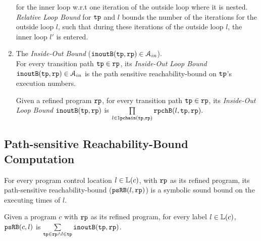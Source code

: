 \begin{enumerate}
{for the inner loop w.r.t one iteration of the outside loop where it is nested.
\emph{Relative Loop Bound} for $\mathtt{tp}$ and $l$ bounds the number of the iterations for
the outside loop $l$,
such that during these iterations of the outside loop $l$, the inner loop $l'$ is entered. 
}
\item The \emph{Inside-Out Bound} ($\mathtt{inoutB}(\mathtt{tp}, \mathtt{rp}) \in \mathcal{A}_{in}$).
\\
For every transition path $\mathtt{tp} \in \mathtt{rp}$,
its \emph{Inside-Out Loop Bound}
 $\mathtt{inoutB}(\mathtt{tp}, \mathtt{rp}) \in \mathcal{A}_{in}$ is 
the path sensitive reachability-bound on $\mathtt{tp}$'s execution numbers.

\begin{defn}
  \label{def:outin_bound}
  Given a refined program $\mathtt{rp}$, for every transition path $\mathtt{tp} \in \mathtt{rp}$, 
  its \emph{Inside-Out Loop Bound}
  $\mathtt{inoutB}(\mathtt{tp}, \mathtt{rp})$ is 
$
  \prod\limits_{l \in \mathtt{lpchain}(\mathtt{tp}, \mathtt{rp})} \mathtt{rpchB}(l, \mathtt{tp}, \mathtt{rp}).
$
\end{defn}
\end{enumerate}
\subsection{Path-sensitive Reachability-Bound Computation}

For every program control location $l \in \mathbb{L}(c)$, with $\mathtt{rp}$ as its refined program,
its path-sensitive reachability-bound ($\mathtt{psRB}(l, \mathtt{rp})$) is a symbolic sound bound on the executing times of $l$.
 \begin{defn}
  \label{def:label_psrb}
  Given a program $c$ with $\mathtt{rp}$ as its refined program,
  for every label $l \in \mathbb{L}(c)$, $\mathtt{psRB}(c, l)$ is $\sum\limits_{\mathtt{tp} \in \mathtt{rp} \land 
  l \in \mathtt{tp}} \mathtt{inoutB}(\mathtt{tp}, \mathtt{rp})$.
 \end{defn}